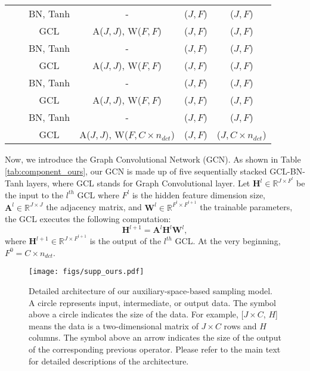 \documentclass[sigconf,screen,nonacm]{acmart}
\begin{document}
\begin{table}[!t]
{\begin{tabular}{c|c|c|c|c|c}
				&                         & BN, Tanh & -                       & ($J, F$)      & ($J, F$)    \\ \cline{3-6}
				&                         & GCL      & A($J, J$), W($F, F$)   & ($J, F$)      & ($J, F$)    \\ \cline{3-6}
				&                         & BN, Tanh &   -                     & ($J, F$)      & ($J, F$)    \\ \cline{3-6}
				&                         & GCL      & A($J, J$), W($F, F$)   & ($J, F$)      & ($J, F$)    \\ \cline{3-6}
				&                         & BN, Tanh &   -                     & ($J, F$)      & ($J, F$)    \\ \cline{3-6}
				&                         & GCL      & A($J, J$), W($F, F$)   & ($J, F$)      & ($J, F$)    \\ \cline{3-6}
				&                         & BN, Tanh &  -                   & ($J, F$)      & ($J, F$)    \\ \cline{3-6}
				&                         & GCL      & A($J, J$), W($F, C \times n_{dct}$)    & ($J, F$)      & ($J, C \times n_{dct}$)     \\ 
				\bottomrule
		\end{tabular}}
	\end{table}
	
	
	Now, we introduce the Graph Convolutional Network (GCN). As shown in Table \ref{tab:component_ours}, our GCN is made up of five sequentially stacked GCL-BN-Tanh layers, where GCL stands for Graph Convolutional layer. Let $\textbf{H}^l\in{\mathbb{R}^{J\times F^l}}$ be the input to the $l^{th}$ GCL where $F^{l}$ is the hidden feature dimension size, $\textbf{A}^l\in{\mathbb{R}^{J\times J}}$ the adjacency matrix, and $\textbf{W}^l\in{\mathbb{R}^{F^l\times F^{l+1}}}$ the trainable parameters, the GCL executes the following computation:
	\begin{equation}
		\textbf{H}^{l+1} = \textbf{A}^l\textbf{H}^l\textbf{W}^l,
	\end{equation}
	where $\textbf{H}^{l+1}\in{\mathbb{R}^{J\times F^{l+1}}}$ is the output of the $l^{th}$ GCL. At the very beginning, $F^0=C\times n_{dct}$.
	
	
	\begin{figure*}[!t]
		\centering
		\texttt{[image: figs/supp\_ours.pdf]}\\
		\caption{Detailed architecture of our auxiliary-space-based sampling model. A circle represents input, intermediate, or output data. The symbol above a circle indicates the size of the data. For example, [$J\times C$, $H$] means the data is a two-dimensional matrix of $J\times C$ rows and $H$ columns. The symbol above an arrow indicates the size of the output of the corresponding previous operator. Please refer to the main text for detailed descriptions of the architecture. }
\label{fig:our-arch}
	\end{figure*}
	
\end{document}
